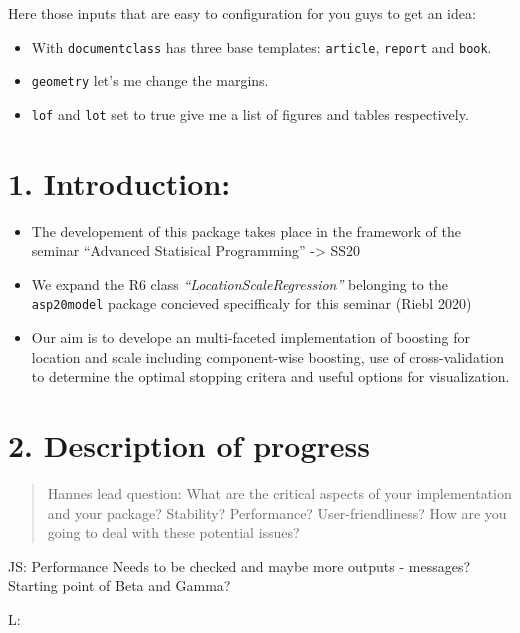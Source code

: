 \documentclass[
]{report}
\providecommand{\tightlist}{%
  \setlength{\itemsep}{0pt}\setlength{\parskip}{0pt}}
\begin{document}
Here those inputs that are easy to configuration for you guys to get an
idea:

\begin{itemize}
\tightlist
\item
  With \texttt{documentclass} has three base templates:
  \texttt{article}, \texttt{report} and \texttt{book}.
\item
  \texttt{geometry} let's me change the margins.
\item
  \texttt{lof} and \texttt{lot} set to true give me a list of figures
  and tables respectively.
\end{itemize}

\hypertarget{introduction}{%
\chapter{1. Introduction:}\label{introduction}}

\begin{itemize}
\tightlist
\item
  The developement of this package takes place in the framework of the
  seminar ``Advanced Statisical Programming'' -\textgreater{} SS20
\item
  We expand the R6 class \emph{``LocationScaleRegression''} belonging to
  the \texttt{asp20model} package concieved specifficaly for this
  seminar (Riebl 2020)
\item
  Our aim is to develope an multi-faceted implementation of boosting for
  location and scale including component-wise boosting, use of
  cross-validation to determine the optimal stopping critera and useful
  options for visualization.
\end{itemize}

\hypertarget{description-of-progress}{%
\chapter{2. Description of progress}\label{description-of-progress}}

\begin{quote}
Hannes lead question: What are the critical aspects of your
implementation and your package? Stability? Performance?
User-friendliness? How are you going to deal with these potential
issues?
\end{quote}

JS: Performance Needs to be checked and maybe more outputs - messages?
Starting point of Beta and Gamma?

L:
\end{document}

